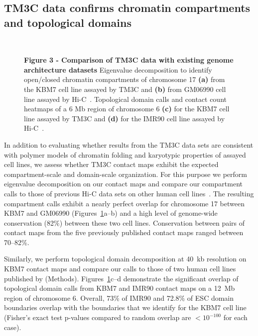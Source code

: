 \subsection*{TM3C data confirms chromatin compartments and topological domains}
{

\begin{figure}
  \centering
  \hspace{0.05\textwidth}
  \vspace{0.02\textheight}
  \\[-\lineskip]
  \hspace{0.05\textwidth}
\caption{
\textbf{Figure 3 - Comparison of TM3C data with existing genome architecture datasets}
Eigenvalue decomposition to identify open/closed chromatin compartments of
chromosome 17 {\bf(a)} from the KBM7 cell line assayed by TM3C and {\bf(b)}
from GM06990 cell line assayed by Hi-C~\citep{lieberman-aiden:comprehensive}.
Topological domain calls and contact count heatmaps of a 6 Mb region of chromosome 6
{\bf(c)} for the KBM7 cell line assayed by TM3C and {\bf(d)} for the
IMR90 cell line assayed by Hi-C~\citep{dixon:topological}.
}
\label{fig:cellLineComparison}
\end{figure}


In addition to evaluating whether results from the TM3C data sets are consistent with
polymer models of chromatin folding and karyotypic properties of assayed cell lines,
we assess whether TM3C contact maps exhibit the expected compartment-scale and domain-scale
organization. For this purpose we perform eigenvalue decomposition on our
contact maps and compare our compartment calls to those of previous Hi-C data sets
on other human cell lines~\citep{lieberman-aiden:comprehensive,dixon:topological}.
The resulting compartment calls exhibit a nearly perfect overlap for chromosome 17
between KBM7 and GM06990 (Figures~\ref{fig:cellLineComparison}a--b)
and a high level
of genome-wide conservation (82$\%$) between these two cell lines. Conservation
between pairs of contact maps from the five previously published contact maps
ranged between 70--82\%.

Similarly, we perform topological domain decomposition at 40~kb resolution on
KBM7 contact maps and compare our calls to those of two human cell lines
published by \citet{dixon:topological} (Methods).
Figures~\ref{fig:cellLineComparison}c--d demonstrate the significant overlap of
topological domain calls from KBM7 and IMR90 contact maps on a 12~Mb region of
chromosome 6. Overall, 73\% of IMR90 and 72.8\% of ESC domain boundaries overlap
with the boundaries that we identify for the KBM7 cell line
(Fisher's exact test p-values compared to random overlap are $<10^{-100}$ for each case).
}

